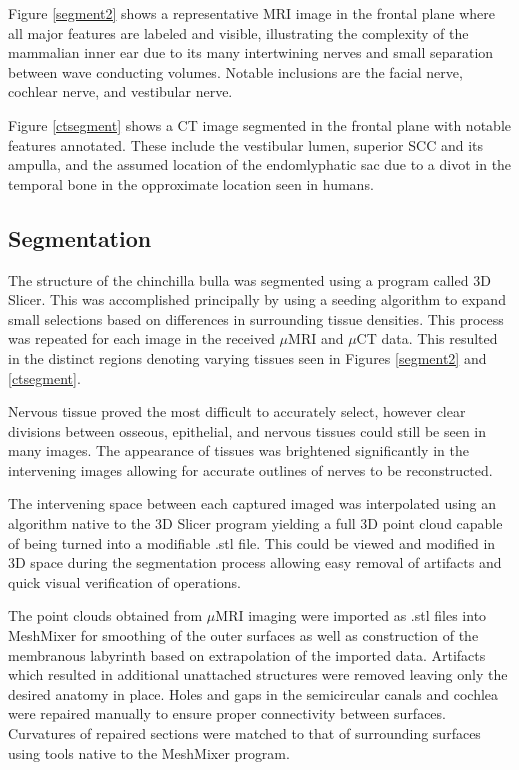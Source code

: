 \documentclass[12pt]{article}
\begin{document}
Figure \ref{segment2} shows a representative MRI image in the frontal plane where all major features are labeled and visible, illustrating the complexity of the mammalian inner ear due to its many intertwining nerves and small separation between wave conducting volumes. Notable inclusions are the facial nerve, cochlear nerve, and vestibular nerve.

Figure \ref{ctsegment} shows a CT image segmented in the frontal plane with notable features annotated. These include the vestibular lumen, superior SCC and its ampulla, and the assumed location of the endomlyphatic sac due to a divot in the temporal bone in the opproximate location seen in humans.\cite{ensac}


\subsection{Segmentation}
The structure of the chinchilla bulla was segmented using a program called 3D Slicer. \cite{slicer} This was accomplished principally by using a seeding algorithm to expand small selections based on differences in surrounding tissue densities. This process was repeated for each image in the received $\mu$MRI and $\mu$CT data. This resulted in the distinct regions denoting varying tissues seen in Figures \ref{segment2} and \ref{ctsegment}.

Nervous tissue proved the most difficult to accurately select, however clear divisions between osseous, epithelial, and nervous tissues could still be seen in many images. The appearance of tissues was brightened significantly in the intervening images allowing for accurate outlines of nerves to be reconstructed.

The intervening space between each captured imaged was interpolated using an algorithm native to the 3D Slicer program yielding a full 3D point cloud capable of being turned into a modifiable .stl file. \cite{slicer} This could be viewed and modified in 3D space during the segmentation process allowing easy removal of artifacts and quick visual verification of operations.

The point clouds obtained from $\mu$MRI imaging were imported as .stl files into MeshMixer for smoothing of the outer surfaces as well as construction of the membranous labyrinth based on extrapolation of the imported data. Artifacts which resulted in additional unattached structures were removed leaving only the desired anatomy in place. Holes and gaps in the semicircular canals and cochlea were repaired manually to ensure proper connectivity between surfaces. Curvatures of repaired sections were matched to that of surrounding surfaces using tools native to the MeshMixer program.
\end{document}
